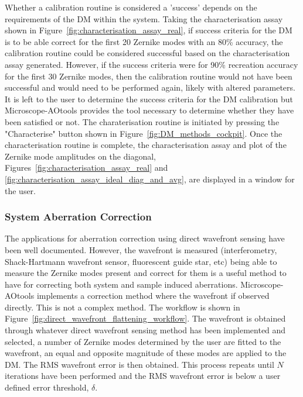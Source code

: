 Whether a calibration routine is considered a 'success' depends on the requirements of the DM within the system. Taking the characterisation assay shown in Figure~\ref{fig:characterisation_assay_real}, if success criteria for the DM is to be able correct for the first 20 Zernike modes with an 80\% accuracy, the calibration routine could be considered successful based on the characterisation assay generated. However, if the success criteria were for 90\% recreation accuracy for the first 30 Zernike modes, then the calibration routine would not have been successful and would need to be performed again, likely with altered parameters. It is left to the user to determine the success criteria for the DM calibration but Microscope-AOtools provides the tool necessary to determine whether they have been satisfied or not. The charaterisation routine is initiated by pressing the "Characterise" button shown in Figure~\ref{fig:DM_methods_cockpit}. Once the characterisation routine is complete, the characterisation assay and plot of the Zernike mode amplitudes on the diagonal, Figures~\ref{fig:characterisation_assay_real} and \ref{fig:characterisation_assay_ideal_diag_and_avg}, are displayed in a window for the user.

\subsubsection{System Aberration Correction}
\label{subsubsec:system_correction}

The applications for aberration correction using direct wavefront sensing have been well documented. However, the wavefront is measured (interferometry, Shack-Hartmann wavefront sensor, fluorescent guide star, etc) being able to measure the Zernike modes present and correct for them is a useful method to have for correcting both system and sample induced aberrations. Microscope-AOtools implements a correction method where the wavefront if observed directly. This is not a complex method. The workflow is shown in Figure~\ref{fig:direct_wavefront_flattening_workflow}. The wavefront is obtained through whatever direct wavefront sensing method has been implemented and selected, a number of Zernike modes determined by the user are fitted to the wavefront, an equal and opposite magnitude of these modes are applied to the DM. The RMS wavefront error is then obtained. This process repeats until $N$ iterations have been performed and the RMS wavefront error is below a user defined error threshold, $\delta$.

